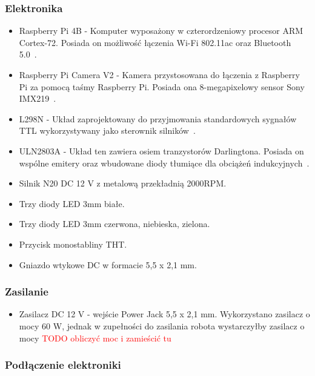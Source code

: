 \subsubsection{Elektronika}
    \begin{itemize}
        \item Raspberry Pi 4B - Komputer wyposażony w czterordzeniowy procesor ARM Cortex-72. Posiada on możliwość łączenia Wi-Fi 802.11ac oraz Bluetooth 5.0~\cite{malina}.
        \item Raspberry Pi Camera V2 - Kamera przystosowana do łączenia z Raspberry Pi za pomocą taśmy Raspberry Pi. Posiada ona 8-megapixelowy sensor Sony IMX219~\cite{malina}.
        \item L298N - Układ zaprojektowany do przyjmowania standardowych sygnałów TTL wykorzystywany jako sterownik silników~\cite{L298}.
        \item ULN2803A - Układ ten zawiera osiem tranzystorów Darlingtona. Posiada on wspólne emitery oraz wbudowane diody tłumiące dla obciążeń indukcyjnych~\cite{ULN2803a}.
        \item Silnik N20 DC 12 V z metalową przekładnią 2000RPM.
        \item Trzy diody LED 3mm białe.
        \item Trzy diody LED 3mm czerwona, niebieska, zielona.
        \item Przycisk monostabliny THT.
        \item Gniazdo wtykowe DC w formacie 5,5 x 2,1 mm.
    \end{itemize}


\subsubsection{Zasilanie}
\begin{itemize}
    \item Zasilacz DC 12 V - wejście Power Jack 5,5 x 2,1 mm. Wykorzystano zasilacz o mocy 60 W, jednak w zupełności do zasilania robota wystarczyłby zasilacz o mocy \textcolor{red}{TODO obliczyć moc i zamieścić tu}
\end{itemize}

\subsubsection{Podłączenie elektroniki}

